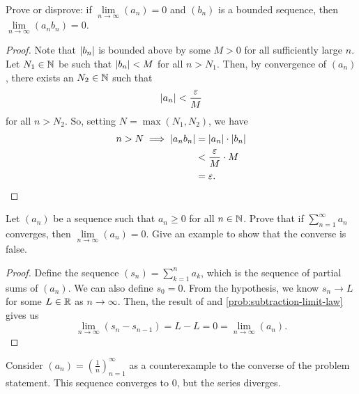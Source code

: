 \begin{problem}
  Prove or disprove: if $\lim\limits_{n \to \infty} (a_{n}) = 0$ and $(b_{n})$ is
  a bounded sequence, then $\lim\limits_{n \to \infty} (a_{n}b_{n}) = 0$.

  \begin{proof} 
    Note that $\left\lvert b_{n} \right\rvert$ is bounded above by some $M > 0$ for all sufficiently large $n$.
    Let $N_{1} \in \mathbb{N}$ be such that $\left\lvert b_{n} \right\rvert < M$ for all $n > N_{1}$. Then, by convergence
    of $(a_{n})$, there exists an $N_{2} \in \mathbb{N}$ such that 
    \[
      \left\lvert a_{n} \right\rvert < \frac{\varepsilon}{M}
    \]
    for all $n > N_{2}$. So, setting $N = \max{(N_{1}, N_{2})}$, we have
    \begin{align*}
      n > N \implies \left\lvert a_{n}b_{n} \right\rvert &= \left\lvert a_{n} \right\rvert \cdot \left\lvert b_{n} \right\rvert \\
                                      &< \frac{\varepsilon}{M} \cdot M \\
                                      &= \varepsilon.
    \end{align*}
  \end{proof}

\end{problem}

\begin{problem}
  Let $(a_{n})$ be a sequence such that $a_{n} \geq 0$ for all $n \in \mathbb{N}$. 
  Prove that if $\sum\limits_{n=1}^{\infty} a_{n}$ converges, then
  $\lim\limits_{n \to \infty} (a_{n}) = 0$. Give an example to show that the 
  converse is false.

  \begin{proof} 
    Define the sequence $(s_{n}) = \sum\limits_{k=1}^{n} a_{k}$, which is the sequence of partial sums of $(a_{n})$.
    We can also define $s_{0} = 0$. From the hypothesis, we know $s_{n} \to L$ for some $L \in \mathbb{R}$ as $n \to \infty$.
    Then, the result of  and \ref{prob:subtraction-limit-law}
    gives us
    \[
      \lim\limits_{n \to \infty} (s_{n} - s_{n - 1}) = L - L = 0 = \lim\limits_{n \to \infty} (a_{n}).
    \]
  \end{proof}

  Consider $(a_{n}) = \left( \frac{1}{n} \right)_{n=1}^{\infty}$ as a counterexample to the converse
  of the problem statement. This sequence converges to $0$, but the series diverges.


\end{problem}
